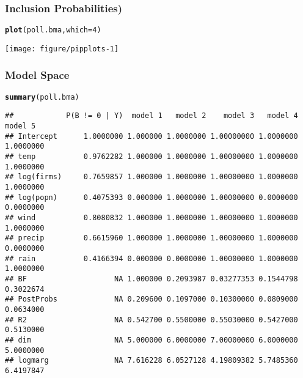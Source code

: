 \documentclass[handout]{beamer}\usepackage[]{graphicx}\usepackage[]{color}
\makeatletter
\def\maxwidth{ %
  \ifdim\Gin@nat@width>\linewidth
    \linewidth
  \else
    \Gin@nat@width
  \fi
}
\newcommand{\hlnum}[1]{\textcolor[rgb]{0.686,0.059,0.569}{#1}}%
\newcommand{\hlstd}[1]{\textcolor[rgb]{0.345,0.345,0.345}{#1}}%
\newcommand{\hlkwc}[1]{\textcolor[rgb]{0.333,0.667,0.333}{#1}}%
\newcommand{\hlkwd}[1]{\textcolor[rgb]{0.737,0.353,0.396}{\textbf{#1}}}%
\newenvironment{kframe}{%
 \def\at@end@of@kframe{}%
 \ifinner\ifhmode%
  \def\at@end@of@kframe{\end{minipage}}%
  \begin{minipage}{\columnwidth}%
 \fi\fi%
 \def\FrameCommand##1{\hskip\@totalleftmargin \hskip-\fboxsep
 \colorbox{shadecolor}{##1}\hskip-\fboxsep
     \hskip-\linewidth \hskip-\@totalleftmargin \hskip\columnwidth}%
 \MakeFramed {\advance\hsize-\width
   \@totalleftmargin\z@ \linewidth\hsize
   \@setminipage}}%
 {\par\unskip\endMakeFramed%
 \at@end@of@kframe}
\newenvironment{knitrout}{}{} %
\makeatother
\begin{document}
\begin{frame}\frametitle{Inclusion Probabilities)}
\begin{knitrout}
\color{fgcolor}\begin{kframe}
\begin{alltt}
\hlkwd{plot}\hlstd{(poll.bma,} \hlkwc{which}\hlstd{=}\hlnum{4}\hlstd{)}
\end{alltt}
\end{kframe}

{\centering \texttt{[image: figure/pipplots-1]} 

}



\end{knitrout}
\end{frame}


\begin{frame}[fragile]\frametitle{Model Space}
\begin{knitrout}
\color{fgcolor}\begin{kframe}
\begin{alltt}
\hlkwd{summary}\hlstd{(poll.bma)}
\end{alltt}
\begin{verbatim}
##            P(B != 0 | Y)  model 1   model 2    model 3   model 4   model 5
## Intercept      1.0000000 1.000000 1.0000000 1.00000000 1.0000000 1.0000000
## temp           0.9762282 1.000000 1.0000000 1.00000000 1.0000000 1.0000000
## log(firms)     0.7659857 1.000000 1.0000000 1.00000000 1.0000000 1.0000000
## log(popn)      0.4075393 0.000000 1.0000000 1.00000000 0.0000000 0.0000000
## wind           0.8080832 1.000000 1.0000000 1.00000000 1.0000000 1.0000000
## precip         0.6615960 1.000000 1.0000000 1.00000000 1.0000000 0.0000000
## rain           0.4166394 0.000000 0.0000000 1.00000000 1.0000000 1.0000000
## BF                    NA 1.000000 0.2093987 0.03277353 0.1544798 0.3022674
## PostProbs             NA 0.209600 0.1097000 0.10300000 0.0809000 0.0634000
## R2                    NA 0.542700 0.5500000 0.55030000 0.5427000 0.5130000
## dim                   NA 5.000000 6.0000000 7.00000000 6.0000000 5.0000000
## logmarg               NA 7.616228 6.0527128 4.19809382 5.7485360 6.4197847
\end{verbatim}
\end{kframe}
\end{knitrout}
\end{frame}
\end{document}

